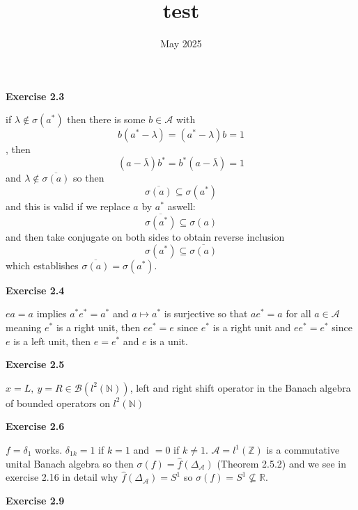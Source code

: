\documentclass{article}
\title{test}
\date{May 2025}
\begin{document}
\textbf{Exercise 2.3}

\vspace{0.5cm}

if $\lambda \not\in \sigma(a^*)$ then there is some $b\in \mathcal A$ with $$b(a^*- \lambda) = (a^*- \lambda)b = 1$$, then $$(a- \bar\lambda)b^* = b^*(a- \bar\lambda) = 1 $$ and $\lambda \not \in \overline{\sigma(a)}$ so then $$\overline{\sigma(a)} \subseteq \sigma(a^*)$$ and this is valid if we replace $a$ by $a^*$ aswell: $$\overline{\sigma(a^*)} \subseteq \sigma(a)$$ and then take conjugate on both sides to obtain reverse inclusion $$\sigma(a^*) \subseteq \overline{\sigma(a)}$$ which establishes $\overline{\sigma(a)} = \sigma(a^*)$.

\vspace{0.5cm}

\textbf{Exercise 2.4} 

\vspace{0.5cm}

$ea = a$ implies $a^*e^* = a^*$ and $a \mapsto a^*$ is surjective so that $ae^* = a$ for all $a \in \mathcal A$ meaning $e^*$ is a right unit, then $ee^* = e$ since $e^*$ is a right unit and $ee^* = e^*$ since $e$ is a left unit, then $e = e^*$ and $e$ is a unit.

\vspace{0.5cm}

\textbf{Exercise 2.5}

\vspace{0.5cm}

$x = L, \ y = R \in \mathcal B(l^2(\mathbb N))$, left and right shift operator in the Banach algebra of bounded operators on $l^2(\mathbb N)$

\vspace{0.5cm}

\textbf{Exercise 2.6}

\vspace{0.5cm}

$f = \delta_1$ works. $\delta_{1k} = 1$ if $k = 1$ and $= 0$ if $k \neq 1$. $\mathcal A =l^1(\mathbb Z)$ is a commutative unital Banach algebra so then $\sigma(f) = \hat f(\Delta_\mathcal A)$ (Theorem 2.5.2) and we see in exercise 2.16 in detail why $\hat f(\Delta_\mathcal A) = S^1$ so $\sigma(f) = S^1 \not \subseteq \mathbb R$.

\vspace{0.5cm}

\textbf{Exercise 2.9}

\vspace{0.5cm}
\end{document}
